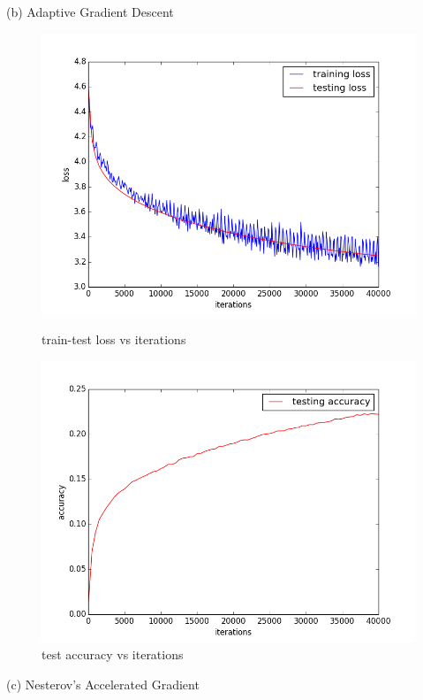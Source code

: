 \documentclass{article} %
\begin{document}
(b) Adaptive Gradient Descent
\begin{figure}[H]
    \begin{minipage}{0.5\linewidth}
        \centering
        \includegraphics[scale=0.35]{AdaGrad_1.png}
        \caption{train-test loss vs iterations}
    \end{minipage}
    \begin{minipage}{0.5\linewidth}
        \centering
        \includegraphics[scale=0.35]{AdaGrad_2.png}
     \caption{test accuracy vs iterations}
    \end{minipage}
\end{figure}
(c) Nesterov’s Accelerated Gradient
\end{document}
